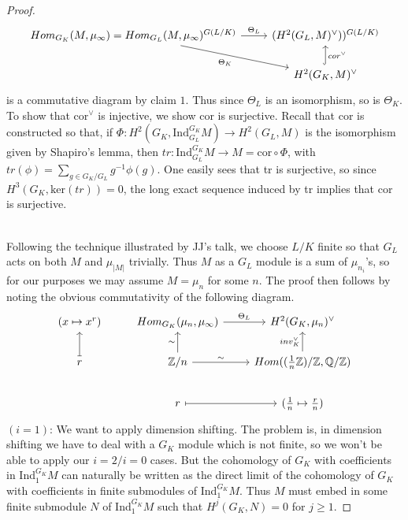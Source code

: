\documentclass[class=article, crop=false]{standalone}
\begin{document}
\begin{proof}
\[\begin{tikzcd}
{Hom_{G_K}(M,\mu_{\infty})=Hom_{G_L}(M,\mu_{\infty})^{G(L/K)}} \arrow[rd, "\Theta_K"'] \arrow[r, "\Theta_L"] & {(H^2(G_L,M)^{\vee}))^{G(L/K)}}                      \\
                                                                                                                & {H^2(G_K,M)^{\vee}} \arrow[u, "cor^{\vee}"', hook]
\end{tikzcd}\]
is a commutative diagram by claim $1$. Thus since $\Theta_L$ is an isomorphism, so is $\Theta_K$.
\vskip 3pt
To show that cor$^{\vee}$ is injective, we show cor is surjective. Recall that cor is constructed so that, if $\Phi:H^2(G_K, \text{Ind}_{G_L}^{G_K}M) \to H^2(G_L,M)$ is the isomorphism given by Shapiro's lemma, then $tr:\text{Ind}_{G_L}^{G_K}M \to M = \text{cor}\circ \Phi$, with $tr(\phi) = \sum_{g\in G_K/G_L}g^{-1}\phi(g)$. One easily sees that tr is surjective, so since $H^3(G_K, \text{ker}(tr)) = 0$, the long exact sequence induced by tr implies that cor is surjective.
\par 
\mbox{}\hfill \qedsymbol
\\
Following the technique illustrated by JJ's talk, we choose $L/K$ finite so that $G_L$ acts on both $M$ and $\mu_{|M|}$ trivially. Thus $M$ as a $G_L$ module is a sum of $\mu_{n_i}$'s, so for our purposes we may assume $M=\mu_n$ for some $n$.
\vskip 5pt
The proof then follows by noting the obvious commutativity of the following diagram.
\[\begin{tikzcd}
(x\mapsto x^r)       & {Hom_{G_K}(\mu_n, \mu_{\infty})} \arrow[r, "\Theta_L"] & {H^2(G_K, \mu_n)^{\vee}}                                                                   \\
r \arrow[u, maps to] & \mathbb{Z}/n \arrow[u, "\sim"] \arrow[r, "\sim"]       & {Hom((\frac{1}{n}\mathbb{Z})/\mathbb{Z}, \mathbb{Q}/\mathbb{Z})} \arrow[u, "inv_K^{\vee}"] \\
                     & r \arrow[r, maps to]                                   & (\frac{1}{n} \mapsto \frac{r}{n})                                                         
\end{tikzcd}\]
$(i=1)$: We want to apply dimension shifting. The problem is, in dimension shifting we have to deal with a $G_K$ module which is not finite, so we won't be able to apply our $i=2/i=0$ cases.
\vskip 5pt
But the cohomology of $G_K$ with coefficients in Ind$_1^{G_K}M$ can naturally be written as the direct limit of the cohomology of $G_K$ with coefficients in finite submodules of Ind$_1^{G_K}M$. Thus $M$ must embed in some finite submodule $N$ of Ind$_1^{G_K}M$ such that $H^j(G_K,N)=0$ for $j\geq 1$.

\end{proof}
\end{document}
